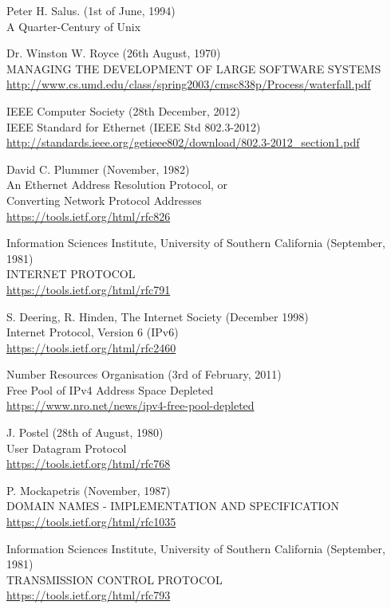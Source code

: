 \documentclass[10pt,a4paper,notitlepage,twoside]{report}
\begin{document}
\begin{thebibliography}{99}
    Peter H. Salus. (1st of June, 1994)\\
    A Quarter-Century of Unix

    Dr. Winston W. Royce (26th August, 1970)\\
    MANAGING THE DEVELOPMENT OF LARGE SOFTWARE SYSTEMS\\
    \url{http://www.cs.umd.edu/class/spring2003/cmsc838p/Process/waterfall.pdf}
    
	IEEE Computer Society (28th December, 2012)\\
	IEEE Standard for Ethernet (IEEE Std 802.3-2012)\\
	\url{http://standards.ieee.org/getieee802/download/802.3-2012_section1.pdf}
	
	David C. Plummer (November, 1982)\\
	An Ethernet Address Resolution Protocol, or\\
	Converting Network Protocol Addresses\\
	\url{https://tools.ietf.org/html/rfc826}
	
	Information Sciences Institute, University of Southern California (September, 1981)\\
	INTERNET PROTOCOL\\
	\url{https://tools.ietf.org/html/rfc791}
	
	S. Deering, R. Hinden, The Internet Society (December 1998)\\
	Internet Protocol, Version 6 (IPv6)\\
	\url{https://tools.ietf.org/html/rfc2460}

	Number Resources Organisation (3rd of February, 2011)\\
	Free Pool of IPv4 Address Space Depleted\\
	\url{https://www.nro.net/news/ipv4-free-pool-depleted}

	J. Postel (28th of August, 1980)\\
	User Datagram Protocol\\
	\url{https://tools.ietf.org/html/rfc768}

	P. Mockapetris (November, 1987)\\
	DOMAIN NAMES - IMPLEMENTATION AND SPECIFICATION\\
	\url{https://tools.ietf.org/html/rfc1035}

	Information Sciences Institute, University of Southern California (September, 1981)\\
	TRANSMISSION CONTROL PROTOCOL\\
	\url{https://tools.ietf.org/html/rfc793}


\end{thebibliography}
\end{document}
